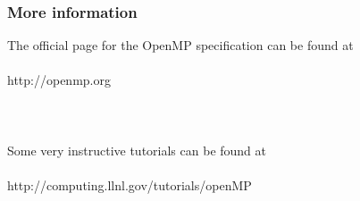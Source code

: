 \begin{frame}
  \frametitle{More information}
  \begin{center}
    The official page for the OpenMP specification can be found at \\~\\
    http://openmp.org \\~\\ \\~\\
    Some very instructive tutorials can be found at \\~\\
    http://computing.llnl.gov/tutorials/openMP
  \end{center}
\end{frame}



